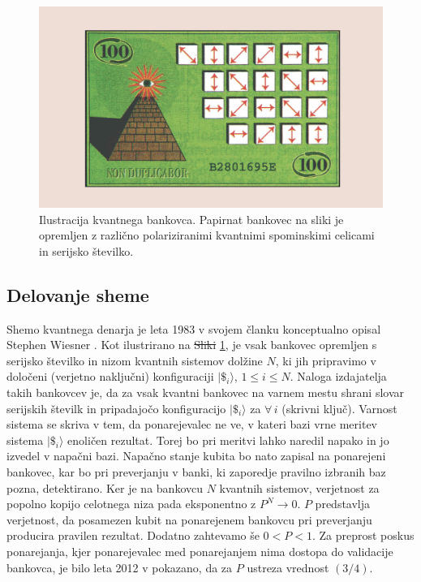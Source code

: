 \documentclass[12pt]{article}
\providecommand{\DIFadd}[1]{{\protect\color{blue}\uwave{#1}}} %
\providecommand{\DIFdel}[1]{{\protect\color{red}\sout{#1}}}                      %
\providecommand{\DIFaddbegin}{} %
\providecommand{\DIFaddend}{} %
\providecommand{\DIFdelbegin}{} %
\providecommand{\DIFdelend}{} %
\newcommand{\DIFscaledelfig}{0.5}
\newlength{\DIFdelgraphicswidth} %
\newlength{\DIFdelgraphicsheight} %
\newcommand{\DIFaddincludegraphics}[2][]{{\color{blue}\fbox{\DIFOincludegraphics[#1]{#2}}}} %
\newcommand{\DIFdelincludegraphics}[2][]{%
\sbox{\DIFdelgraphicsbox}{\DIFOincludegraphics[#1]{#2}}%
\settoboxwidth{\DIFdelgraphicswidth}{\DIFdelgraphicsbox} %
\settoboxtotalheight{\DIFdelgraphicsheight}{\DIFdelgraphicsbox} %
\scalebox{\DIFscaledelfig}{%
\parbox[b]{\DIFdelgraphicswidth}{\usebox{\DIFdelgraphicsbox}\\[-\baselineskip] \rule{\DIFdelgraphicswidth}{0em}}\llap{\resizebox{\DIFdelgraphicswidth}{\DIFdelgraphicsheight}{%
\setlength{\unitlength}{\DIFdelgraphicswidth}%
\begin{picture}(1,1)%
\thicklines\linethickness{2pt} %
{\color[rgb]{1,0,0}\put(0,0){\framebox(1,1){}}}%
{\color[rgb]{1,0,0}\put(0,0){\line( 1,1){1}}}%
{\color[rgb]{1,0,0}\put(0,1){\line(1,-1){1}}}%
\end{picture}%
}\hspace*{3pt}}} %
} %
\DeclareRobustCommand{\DIFaddbegin}{\DIFOaddbegin \let\includegraphics\DIFaddincludegraphics} %
\DeclareRobustCommand{\DIFaddend}{\DIFOaddend \let\includegraphics\DIFOincludegraphics} %
\DeclareRobustCommand{\DIFdelbegin}{\DIFOdelbegin \let\includegraphics\DIFdelincludegraphics} %
\DeclareRobustCommand{\DIFdelend}{\DIFOaddend \let\includegraphics\DIFOincludegraphics} %
\begin{document}
\begin{figure}[H]
\includegraphics[width=12cm]{qmon.png}
\centering
\caption{Ilustracija kvantnega bankovca. Papirnat bankovec na sliki je opremljen z različno polariziranimi kvantnimi spominskimi celicami in serijsko številko. \cite{aaronsonQuantumMoney2012}}
\label{fig:qmoney}
\end{figure}

\subsection{Delovanje sheme}

Shemo kvantnega denarja je leta 1983 v svojem članku konceptualno opisal Stephen Wiesner \cite{wiesnerConjugateCoding1983}. Kot ilustrirano na \DIFdelbegin \DIFdel{Sliki }\DIFdelend \DIFaddbegin \DIFadd{sliki }\DIFaddend \ref{fig:qmoney}, je vsak bankovec opremljen s serijsko številko in nizom kvantnih sistemov dolžine $N$, ki jih pripravimo v določeni (verjetno naključni) konfiguraciji $| \$_i \rangle$, $1 \le i \le N$. Naloga izdajatelja takih bankovcev je, da za vsak kvantni bankovec na varnem mestu shrani slovar serijskih številk in pripadajočo konfiguracijo $| \$_i \rangle$ za $\forall \, i$ (skrivni ključ). Varnost sistema se skriva v tem, da ponarejevalec ne ve, v kateri bazi vrne meritev sistema $| \$_i \rangle$ enoličen rezultat. Torej bo pri meritvi lahko naredil napako in jo izvedel v napačni bazi. Napačno stanje kubita bo nato zapisal na ponarejeni bankovec, kar bo pri preverjanju v banki, ki zaporedje pravilno izbranih baz pozna, detektirano. Ker je na bankovcu $N$ kvantnih sistemov, verjetnost za popolno kopijo celotnega niza pada eksponentno z $P^N \rightarrow 0$. $P$ predstavlja verjetnost, da posamezen kubit na ponarejenem bankovcu pri preverjanju producira pravilen rezultat. Dodatno zahtevamo še $0 < P < 1$. Za preprost poskus ponarejanja, kjer ponarejevalec med ponarejanjem nima dostopa do validacije bankovca, je bilo leta 2012 v \cite{molinaOptimalCounterfeitingAttacks2012} pokazano, da za $P$ ustreza vrednost $(3/4)$. \DIFdelbegin %
\end{document}
